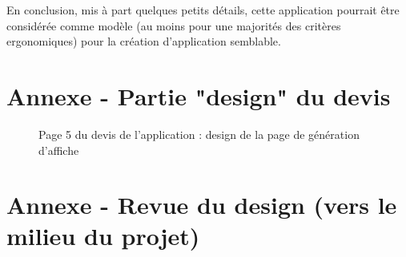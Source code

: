 \documentclass{article}
\begin{document}
\begin{sffamily}
En conclusion, mis à part quelques petits détails, cette application pourrait être considérée comme modèle (au moins 
pour une majorités des critères ergonomiques) pour la création d'application semblable.

\newpage

\appendix

\section{Annexe - Partie "design" du devis}

\begin{figure}[h!]
	 \begin{center}
	   \caption{Page 5 du devis de l'application : design de la page de génération d'affiche}
	\end{center}
\end{figure}

\section{Annexe - Revue du design (vers le milieu du projet)}


\end{sffamily}
\end{document}
